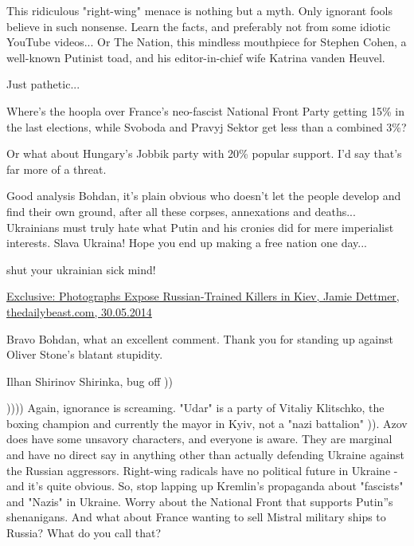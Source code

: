 \begin{itemize}
\begin{itemize}

This ridiculous "right-wing" menace is nothing but a myth. Only ignorant fools
believe in such nonsense. Learn the facts, and preferably not from some idiotic
YouTube videos... Or The Nation, this mindless mouthpiece for Stephen Cohen, a
well-known Putinist toad, and his editor-in-chief wife Katrina vanden Heuvel.

Just pathetic...


Where's the hoopla over France's neo-fascist National Front Party getting 15\%
in the last elections, while Svoboda and Pravyj Sektor get less than a combined
3\%?


Or what about Hungary's Jobbik party with 20\% popular support. I'd say that's
far more of a threat.


Good analysis Bohdan, it's plain obvious who doesn't let the people develop and
find their own ground, after all these corpses, annexations and
deaths... Ukrainians must truly hate what Putin and his cronies did for mere
imperialist interests. Slava Ukraina! Hope you end up making a free nation one
day...


shut your ukrainian sick mind!


\href{https://www.thedailybeast.com/exclusive-photographs-expose-russian-trained-killers-in-kiev}{%
Exclusive: Photographs Expose Russian-Trained Killers in Kiev, Jamie Dettmer, thedailybeast.com, 30.05.2014%
}

Bravo Bohdan, what an excellent comment. Thank you for standing up against Oliver Stone's blatant stupidity.

Ilhan Shirinov
Shirinka, bug off ))


)))) Again, ignorance is screaming. "Udar" is a party of Vitaliy Klitschko, the
boxing champion and currently the mayor in Kyiv, not a "nazi battalion" )).
Azov does have some unsavory characters, and everyone is aware. They are
marginal and have no direct say in anything other than actually defending
Ukraine against the Russian aggressors. Right-wing radicals have no political
future in Ukraine - and it's quite obvious. So, stop lapping up Kremlin's
propaganda about "fascists" and "Nazis" in Ukraine. Worry about the National
Front that supports Putin''s shenanigans. And what about France wanting to sell
Mistral military ships to Russia? What do you call that?


\end{itemize}
\end{itemize}
